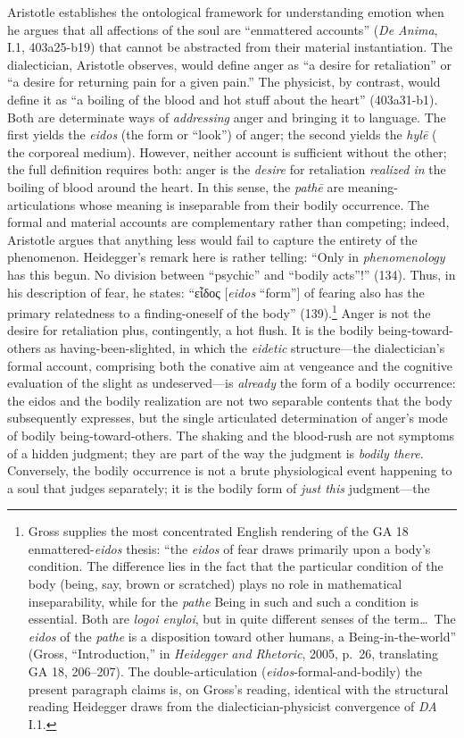 \documentclass{article}
\newcommand{\gk}[1]{{\greekfont #1}}
\begin{document}
Aristotle establishes the ontological framework for understanding emotion when he argues that all affections of the soul are ``enmattered accounts'' (\textit{De Anima}, I.1, 403a25-b19) that cannot be abstracted from their material instantiation. The dialectician, Aristotle observes, would define anger as ``a desire for retaliation'' or ``a desire for returning pain for a given pain.'' The physicist, by contrast, would define it as ``a boiling of the blood and hot stuff about the heart'' (403a31-b1). Both are determinate ways of \textit{addressing} anger and bringing it to language. The first yields the \textit{eidos} (the form or ``look'') of anger; the second yields the \textit{hylē} ( the corporeal medium). However, neither account is sufficient without the other; the full definition requires both: anger is the \textit{desire} for retaliation \textit{realized in} the boiling of blood around the heart. In this sense, the \textit{pathē} are meaning-articulations whose meaning is inseparable from their bodily occurrence. The formal and material accounts are complementary rather than competing; indeed, Aristotle argues that anything less would fail to capture the entirety of the phenomenon. Heidegger's remark here is rather telling: ``Only in \textit{phenomenology} has this begun. No division between ``psychic'' and ``bodily acts''!'' (134). Thus, in his description of fear, he states: ``\gk{εἶδος} [\textit{eidos} ``form''] of fearing also has the primary relatedness to a finding-oneself of the body'' (139).\footnote{Gross supplies the most concentrated English rendering of the GA 18 enmattered-\textit{eidos} thesis: ``the \textit{eidos} of fear draws primarily upon a body's condition. The difference lies in the fact that the particular condition of the body (being, say, brown or scratched) plays no role in mathematical inseparability, while for the \textit{pathe} Being in such and such a condition is essential. Both are \textit{logoi enyloi}, but in quite different senses of the term\ldots\ The \textit{eidos} of the \textit{pathe} is a disposition toward other humans, a Being-in-the-world'' (Gross, ``Introduction,'' in \textit{Heidegger and Rhetoric}, 2005, p.~26, translating GA 18, 206--207). The double-articulation (\textit{eidos}-formal-and-bodily) the present paragraph claims is, on Gross's reading, identical with the structural reading Heidegger draws from the dialectician-physicist convergence of \textit{DA} I.1.} Anger is not the desire for retaliation plus, contingently, a hot flush. It is the bodily being-toward-others as having-been-slighted, in which the \textit{eidetic} structure---the dialectician's formal account, comprising both the conative aim at vengeance and the cognitive evaluation of the slight as undeserved---is \textit{already} the form of a bodily occurrence: the eidos and the bodily realization are not two separable contents that the body subsequently expresses, but the single articulated determination of anger's mode of bodily being-toward-others. The shaking and the blood-rush are not symptoms of a hidden judgment; they are part of the way the judgment is \textit{bodily there}. Conversely, the bodily occurrence is not a brute physiological event happening to a soul that judges separately; it is the bodily form of \textit{just this} judgment---the 
\end{document}
